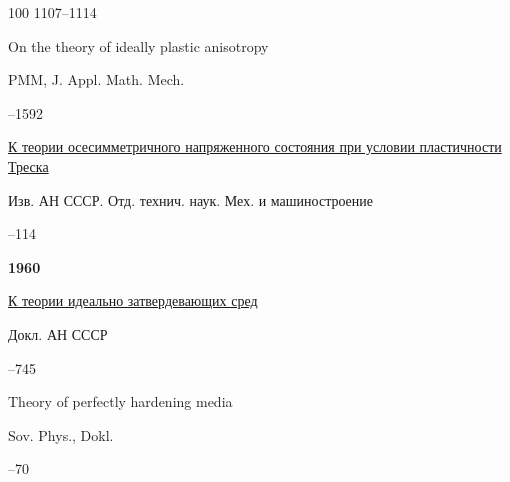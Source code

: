 \begin{thebibliography}{100}
\pages \mbox{1107–1114}


\transl 


\paper \linebreak On the theory of ideally plastic anisotropy

\jour PMM, J. Appl. Math. Mech. 


--1592 








\paper \href{https://zbmath.org/?q=an:0118.19206}{К теории осесимметричного напряженного состояния при условии пластичности Треска}

\jour Изв. АН СССР. Отд. технич. наук. Мех. и машиностроение



–114






\item[] \centerline{\bf 1960}




\paper \href{https://zbmath.org/?q=an:0104.18502}{К теории идеально затвердевающих сред}

\jour Докл. АН СССР




–745


\transl


\paper Theory of perfectly hardening media

\jour Sov. Phys., Dokl. 


--70 





\end{thebibliography}
